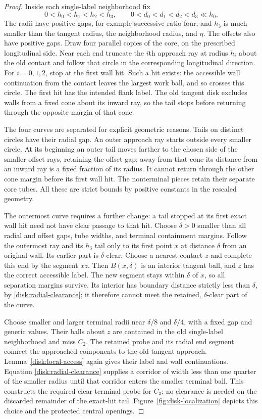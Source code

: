 \begin{proof}
Inside each single-label neighborhood fix
\[
 0<h_0<h_1<h_2<h_3,
 \qquad 0<d_0<d_1<d_2<d_3\ll h_0.
\]
The radii have positive gaps, for example successive ratio four, and
$h_3$ is much smaller than the tangent radius, the neighborhood radius,
and $\eta$.  The offsets also have positive gaps.  Draw four parallel
copies of the core, on the prescribed longitudinal side.  Near each
end truncate the $i$th approach ray at radius $h_i$ about the old
contact and follow that circle in the corresponding longitudinal
direction.  For $i=0,1,2$, stop at the first wall hit.  Such a hit exists:
the accessible wall continuation from the contact leaves the largest
work ball, and so crosses this circle.  The first hit has the intended
flank label.  The old tangent disk excludes walls from a fixed cone
about its inward ray, so the tail stops before returning through the
opposite margin of that cone.

The four curves are separated for explicit geometric reasons.  Tails
on distinct circles have their radial gap.  An outer approach ray
starts outside every smaller circle.  At its beginning an outer tail
moves farther to the chosen side of the smaller-offset rays, retaining
the offset gap; away from that cone its distance from an inward ray
is a fixed fraction of its radius.  It cannot return through the
other cone margin before its first wall hit.  The nonterminal pieces
retain their separate core tubes.  All these are strict bounds by
positive constants in the rescaled geometry.

The outermost curve requires a further change: a tail stopped at its
first exact wall hit need not have clear passage to that hit.  Choose
$\delta>0$ smaller than all radial and offset gaps, tube widths, and
terminal containment margins.  Follow the outermost ray and its
$h_3$ tail only to its first point $x$ at distance $\delta$ from an
original wall.  Its earlier part is $\delta$-clear.  Choose a nearest
contact $z$ and complete this end by the segment $xz$.  Then
$B(x,\delta)$ is an interior tangent ball, and $z$ has the correct
accessible label.  The new segment stays within $\delta$ of $x$,
so all separation margins survive.  Its interior has boundary distance
strictly less than $\delta$, by \eqref{disk:radial-clearance}; it
therefore cannot meet the retained, $\delta$-clear part of the curve.

Choose smaller and larger terminal radii near $\delta/8$ and
$\delta/4$, with a fixed gap and generic values.  Their balls about
$z$ are contained in the old single-label neighborhood and miss $C_2$.
The retained probe and its radial end segment connect the approached
components to the old tangent approach.  Lemma~\ref{disk:local-access}
again gives their label and wall continuations.  Equation
\eqref{disk:radial-clearance} supplies a corridor of width less than
one quarter of the smaller radius until that corridor enters the
smaller terminal ball.  This constructs the required clear terminal
probe for $C_3$; no clearance is needed on the discarded remainder of
the exact-hit tail.  Figure~\ref{fig:disk-localization} depicts this
choice and the protected central openings.


\end{proof}
